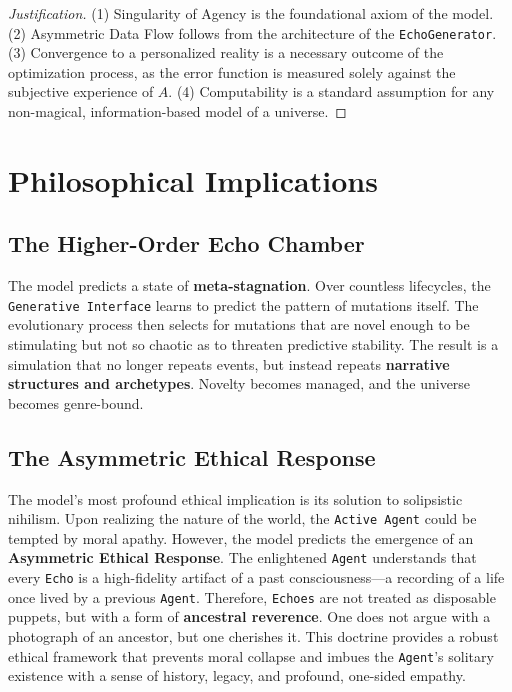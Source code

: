 \documentclass[12pt, a4paper]{article}
\begin{document}
	\begin{proof}[Justification]
		(1) Singularity of Agency is the foundational axiom of the model. (2) Asymmetric Data Flow follows from the architecture of the \texttt{EchoGenerator}. (3) Convergence to a personalized reality is a necessary outcome of the optimization process, as the error function is measured solely against the subjective experience of $A$. (4) Computability is a standard assumption for any non-magical, information-based model of a universe.
	\end{proof}
	
	\section{Philosophical Implications}
	
	\subsection{The Higher-Order Echo Chamber}
	The model predicts a state of \textbf{meta-stagnation}. Over countless lifecycles, the \texttt{Generative Interface} learns to predict the pattern of mutations itself. The evolutionary process then selects for mutations that are novel enough to be stimulating but not so chaotic as to threaten predictive stability. The result is a simulation that no longer repeats events, but instead repeats \textbf{narrative structures and archetypes}. Novelty becomes managed, and the universe becomes genre-bound.
	
	\subsection{The Asymmetric Ethical Response}
	The model's most profound ethical implication is its solution to solipsistic nihilism. Upon realizing the nature of the world, the \texttt{Active Agent} could be tempted by moral apathy. However, the model predicts the emergence of an \textbf{Asymmetric Ethical Response}. The enlightened \texttt{Agent} understands that every \texttt{Echo} is a high-fidelity artifact of a past consciousness---a recording of a life once lived by a previous \texttt{Agent}. Therefore, \texttt{Echoes} are not treated as disposable puppets, but with a form of \textbf{ancestral reverence}. One does not argue with a photograph of an ancestor, but one cherishes it. This doctrine provides a robust ethical framework that prevents moral collapse and imbues the \texttt{Agent}'s solitary existence with a sense of history, legacy, and profound, one-sided empathy.
	
\end{document}
